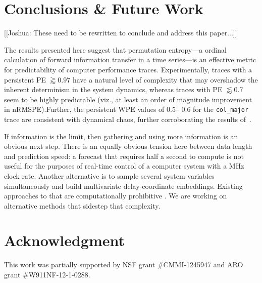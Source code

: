 \documentclass{article}
\begin{document}
\section{ Conclusions \& Future Work}\label{sec:conc}

[[Joshua: These need to be rewritten to conclude and address this paper...]]


The results presented here suggest that permutation entropy---a ordinal
calculation of forward information transfer in a time series---is an effective
metric for predictability of computer performance traces. Experimentally, traces
with a persistent PE $\gtrapprox 0.97$ have a natural level of complexity that
may overshadow the inherent determinism in the system dynamics, whereas traces
with PE $\lessapprox 0.7$ seem to be highly predictable (viz., at least an order
of magnitude improvement in nRMSPE).Further, the persistent WPE values of 0.5--
0.6 for the {\tt col\_major} trace are consistent with dynamical chaos, further
corroborating the results of~\cite{mytkowicz09}.

If information is the limit, then gathering and using more information is an
obvious next step.  There is an equally obvious tension here between data length
and prediction speed: a forecast that requires half a second to compute is not
useful for the purposes of real-time control of a computer system with a MHz
clock rate.  Another alternative is to sample several system variables
simultaneously and build multivariate delay-coordinate embeddings.  Existing
approaches to that are computationally prohibitive
\cite{cao-multivariate-embedding}.  We are working on alternative
methods that sidestep that complexity.











\section*{Acknowledgment}
This work was partially supported by NSF grant \#CMMI-1245947 and ARO
grant \#W911NF-12-1-0288.



\end{document}
